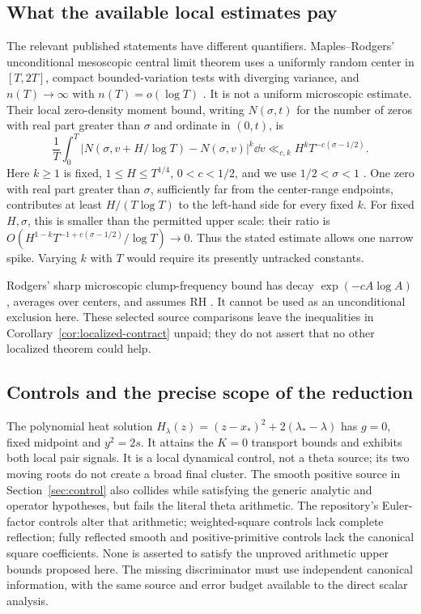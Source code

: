 \subsection{What the available local estimates pay}
The relevant published statements have different quantifiers.
Maples--Rodgers' unconditional mesoscopic central limit theorem uses
a uniformly random center in \([T,2T]\), compact bounded-variation
tests with diverging variance, and \(n(T)\to\infty\) with
\(n(T)=o(\log T)\) \cite[Theorem~1.2]{MaplesRodgers2015}.
It is not a uniform microscopic estimate. Their local zero-density
moment bound, writing \(N(\sigma,t)\) for the number of zeros with
real part greater than \(\sigma\) and ordinate in \((0,t)\), is
\begin{equation}\label{eq:MR-local}
 \frac1T\int_0^T
 |N(\sigma,v+H/\log T)-N(\sigma,v)|^k\dd v
 \ll_{c,k} H^k T^{-c(\sigma-1/2)}.
\end{equation}
Here \(k\ge1\) is fixed, \(1\le H\le T^{1/4}\),
\(0<c<1/2\), and we use \(1/2<\sigma<1\)
\cite[Proposition~2.5]{MaplesRodgers2015}.
One zero with real part greater than \(\sigma\), sufficiently far
from the center-range endpoints, contributes at least
\(H/(T\log T)\) to the left-hand side for every fixed \(k\).
For fixed \(H,\sigma\), this is smaller than the permitted upper
scale: their ratio is
\(O(H^{1-k}T^{-1+c(\sigma-1/2)}/\log T)\to0\).
Thus the stated estimate allows one narrow spike. Varying \(k\)
with \(T\) would require its presently untracked constants.

Rodgers' sharp microscopic clump-frequency bound has decay
\(\exp(-cA\log A)\), averages over centers, and assumes RH
\cite[Theorem~1.1 and Corollary~1.2]{Rodgers2017Tails}.
It cannot be used as an unconditional exclusion here. These selected
source comparisons leave the inequalities in
Corollary~\ref{cor:localized-contract} unpaid; they do not assert
that no other localized theorem could help.

\subsection{Controls and the precise scope of the reduction}
The polynomial heat solution
\(H_\lambda(z)=(z-x_*)^2+2(\lambda_*-\lambda)\)
has \(g=0\), fixed midpoint and \(y^2=2s\). It attains the
\(K=0\) transport bounds and exhibits both local pair signals.
It is a local dynamical control, not a theta source; its two moving
roots do not create a broad final cluster. The smooth positive source
in Section~\ref{sec:control} also collides while satisfying the generic
analytic and operator hypotheses, but fails the literal theta arithmetic.
The repository's Euler-factor controls alter that arithmetic;
weighted-square controls lack complete reflection; fully reflected
smooth and positive-primitive controls lack the canonical square
coefficients. None is asserted to satisfy the unproved arithmetic
upper bounds proposed here. The missing discriminator must use
independent canonical information, with the same source and error
budget available to the direct scalar analysis.
